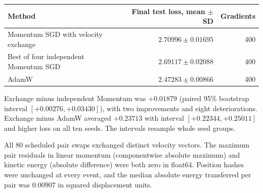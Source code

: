 \begin{center}
\begin{tabular}{@{}lrr@{}}
\toprule
Method & Final test loss, mean \(\pm\) SD & Gradients\\
\midrule
Momentum SGD with velocity exchange & \(2.70996\pm0.01695\) & 400\\
Best of four independent Momentum SGD & \(2.69117\pm0.02088\) & 400\\
AdamW & \(2.47283\pm0.00866\) & 400\\
\bottomrule
\end{tabular}
\end{center}
Exchange minus independent Momentum was \(+0.01879\) (paired 95\% bootstrap interval \([+0.00276,+0.03430]\)), with two improvements and eight deteriorations. Exchange minus AdamW averaged \(+0.23713\) with interval \([+0.22344,+0.25011]\) and higher loss on all ten seeds. The intervals resample whole seed groups.

All 80 scheduled pair swaps exchanged distinct velocity vectors. The maximum pair residuals in linear momentum (componentwise absolute maximum) and kinetic energy (absolute difference) were both zero in float64. Position hashes were unchanged at every event, and the median absolute energy transferred per pair was \(0.00907\) in squared displacement units.
